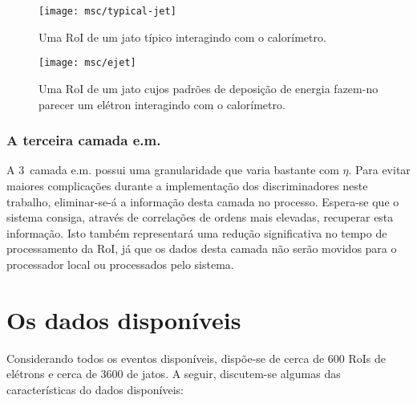 \begin{figure}
\begin{center}
\texttt{[image: msc/typical-jet]}
\end{center}
\caption{Uma RoI de um jato típico interagindo com o calorímetro.}
\label{fig:jroi}
\end{figure}

\begin{figure}
\begin{center}
\texttt{[image: msc/ejet]}
\end{center}
\caption{Uma RoI de um jato cujos padrões de deposição de energia fazem-no
parecer um elétron interagindo com o calorímetro.}
\label{fig:ejet}
\end{figure}

\subsubsection{A terceira camada e.m.}

A 3\eira\ camada e.m. possui uma granularidade que varia bastante com
$\eta$. Para evitar maiores complicações durante a implementação dos
discriminadores neste trabalho, eliminar-se-á a informação desta camada no
processo. Espera-se que o sistema consiga, através de correlações de ordens
mais elevadas, recuperar esta informação. Isto também representará uma redução
significativa no tempo de processamento da RoI, já que os dados desta camada
não serão movidos para o processador local ou processados pelo sistema.

\section{Os dados disponíveis}
\label{sec:inputdata}

Considerando todos os eventos disponíveis, dispõe-se de cerca de 600 RoIs de
elétrons e cerca de 3600 de jatos. A seguir, discutem-se algumas das
características do dados disponíveis:

